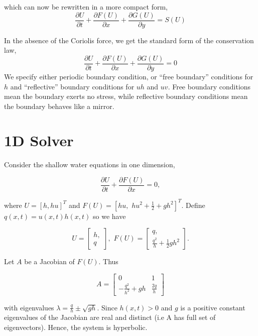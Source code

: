 which can now be rewritten in a more compact form,
\begin{equation}
 {\frac{\partial U}{\partial t} + \frac{\partial F(U)}{\partial x} + \frac{\partial G(U)}{\partial y} = S(U) } \label{eqn:2}
 \end{equation}

 
In the absence of the Coriolis force, we get the standard form of the conservation law,
\begin{equation}
{\frac{\partial U}{\partial t} + \frac{\partial F(U)}{\partial x} + \frac{\partial G(U)}{\partial y} = 0 } \label{eqn:3}
\end{equation}
We specify either periodic boundary condition, or ``free boundary'' conditions for $h$ and ``reflective'' boundary conditions for $uh$ and $uv$.
Free boundary conditions mean the boundary exerts no stress, while reflective boundary conditions mean the boundary behaves like a mirror.

\section{1D Solver}
\par Consider the shallow water equations in one dimension,

\begin{equation}
\frac{\partial U}{\partial t} + \frac{\partial F(U)}{\partial x} = 0,
\end{equation}

where $U = [h, hu]^T$ and $F(U) = [hu,\,\, hu^2 + \frac{1}{2} + gh^2]^T$. Define $q(x,t) = u(x,t) h(x,t)$ so we have

\[U = \begin{bmatrix} h, \\ q\end{bmatrix},\,\, F(U) = \begin{bmatrix} q,\\ \frac{q^2}{h} + \frac{1}{2} gh^2 \end{bmatrix}.\]

Let $A$ be a Jacobian of $F(U)$. Thus

\begin{equation}
A = \begin{bmatrix} 0 & 1 \\ -\frac{q^2}{h^2} + gh & \frac{2q}{h}\end{bmatrix}
\end{equation}

with eigenvalues $\lambda = \frac{q}{h} \pm \sqrt{gh}.$ Since $h(x,t) > 0$ and $g$ is a positive constant eigenvalues of the Jacobian are
real and distinct (i.e A has full set of eigenvectors). Hence, the system is hyperbolic. \newline

